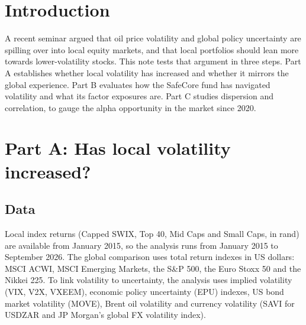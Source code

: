 \documentclass[11pt,preprint]{elsarticle}
\numberwithin{equation}{section}
\numberwithin{figure}{section}
\numberwithin{table}{section}
\begin{document}
\pagestyle{fancy}
\chead{}
\rhead{}
\lfoot{}
\lhead{}
\cfoot{}


\headsep 35pt %




\section{\texorpdfstring{Introduction
\label{Introduction}}{Introduction }}\label{introduction}

A recent seminar argued that oil price volatility and global policy
uncertainty are spilling over into local equity markets, and that local
portfolios should lean more towards lower-volatility stocks. This note
tests that argument in three steps. Part A establishes whether local
volatility has increased and whether it mirrors the global experience.
Part B evaluates how the SafeCore fund has navigated volatility and what
its factor exposures are. Part C studies dispersion and correlation, to
gauge the alpha opportunity in the market since 2020.

\section{\texorpdfstring{Part A: Has local volatility increased?
\label{PartA}}{Part A: Has local volatility increased? }}\label{part-a-has-local-volatility-increased}

\subsection{Data}\label{data}

Local index returns (Capped SWIX, Top 40, Mid Caps and Small Caps, in
rand) are available from January 2015, so the analysis runs from January
2015 to September 2026. The global comparison uses total return indexes
in US dollars: MSCI ACWI, MSCI Emerging Markets, the S\&P 500, the Euro
Stoxx 50 and the Nikkei 225. To link volatility to uncertainty, the
analysis uses implied volatility (VIX, V2X, VXEEM), economic policy
uncertainty (EPU) indexes, US bond market volatility (MOVE), Brent oil
volatility and currency volatility (SAVI for USDZAR and JP Morgan's
global FX volatility index).
\end{document}

